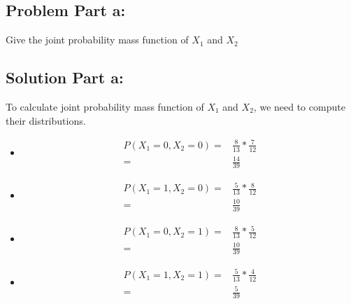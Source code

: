 \documentclass[12pt]{article}%
\begin{document}
\subsection*{Problem Part a:}
Give the joint probability mass function of $X_1$ and $X_2$
\subsection*{Solution Part a:}
To calculate joint probability mass function of $X_1$ and $X_2$, we need to compute their distributions.
\begin{itemize}
\item 
\begin{fleqn}[\parindent]
\begin{equation*}
\begin{split}
P(X_1 = 0, X_2 = 0) = & \frac{8}{13}*\frac{7}{12}\\
					= & \frac{14}{39}
\end{split}
\end{equation*}
\end{fleqn}
\item 
\begin{fleqn}[\parindent]
\begin{equation*}
\begin{split}
P(X_1 = 1, X_2 = 0) = & \frac{5}{13}*\frac{8}{12}\\
					= & \frac{10}{39}
\end{split}
\end{equation*}
\end{fleqn}
\item 
\begin{fleqn}[\parindent]
\begin{equation*}
\begin{split}
P(X_1 = 0, X_2 = 1) = & \frac{8}{13}*\frac{5}{12}\\
					= & \frac{10}{39}
\end{split}
\end{equation*}
\end{fleqn}
\item 
\begin{fleqn}[\parindent]
\begin{equation*}
\begin{split}
P(X_1 = 1, X_2 = 1) = & \frac{5}{13}*\frac{4}{12}\\
					= & \frac{5}{39}
\end{split}
\end{equation*}
\end{fleqn}
\end{itemize}
\end{document}
